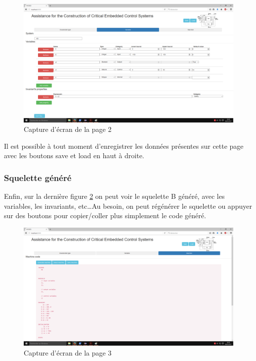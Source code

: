\documentclass[a4paper]{article}
\begin{document}
    \begin{figure}[ht]
        \centering
        \includegraphics[width=\textwidth]{screen2.png}
        \caption{Capture d'écran de la page 2}
        \label{fig:screen2}
    \end{figure}
    
    Il est possible à tout moment d'enregistrer les données présentes sur cette page avec les boutons save et load en haut à droite.
    
\subsubsection{Squelette généré}
    Enfin, sur la dernière figure \ref{fig:screen3} on peut voir le squelette B généré, avec les variables, les invariants, etc\dots Au besoin, on peut régénérer le squelette ou appuyer sur des boutons pour copier/coller plus simplement le code généré.
    
    \begin{figure}[ht]
        \centering
        \includegraphics[width=\textwidth]{screen3.png}
        \caption{Capture d'écran de la page 3}
        \label{fig:screen3}
    \end{figure}
    
\end{document}
